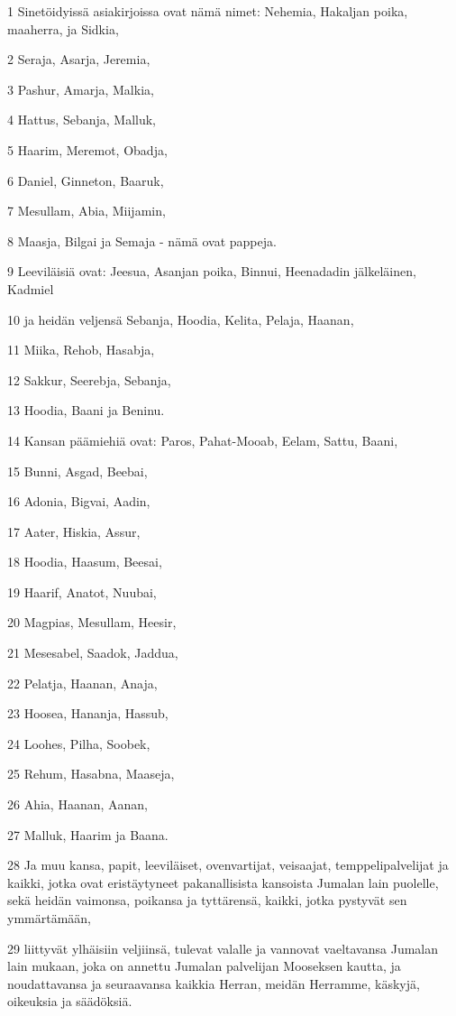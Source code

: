 \par 1 Sinetöidyissä asiakirjoissa ovat nämä nimet: Nehemia, Hakaljan poika, maaherra, ja Sidkia,
\par 2 Seraja, Asarja, Jeremia,
\par 3 Pashur, Amarja, Malkia,
\par 4 Hattus, Sebanja, Malluk,
\par 5 Haarim, Meremot, Obadja,
\par 6 Daniel, Ginneton, Baaruk,
\par 7 Mesullam, Abia, Miijamin,
\par 8 Maasja, Bilgai ja Semaja - nämä ovat pappeja.
\par 9 Leeviläisiä ovat: Jeesua, Asanjan poika, Binnui, Heenadadin jälkeläinen, Kadmiel
\par 10 ja heidän veljensä Sebanja, Hoodia, Kelita, Pelaja, Haanan,
\par 11 Miika, Rehob, Hasabja,
\par 12 Sakkur, Seerebja, Sebanja,
\par 13 Hoodia, Baani ja Beninu.
\par 14 Kansan päämiehiä ovat: Paros, Pahat-Mooab, Eelam, Sattu, Baani,
\par 15 Bunni, Asgad, Beebai,
\par 16 Adonia, Bigvai, Aadin,
\par 17 Aater, Hiskia, Assur,
\par 18 Hoodia, Haasum, Beesai,
\par 19 Haarif, Anatot, Nuubai,
\par 20 Magpias, Mesullam, Heesir,
\par 21 Mesesabel, Saadok, Jaddua,
\par 22 Pelatja, Haanan, Anaja,
\par 23 Hoosea, Hananja, Hassub,
\par 24 Loohes, Pilha, Soobek,
\par 25 Rehum, Hasabna, Maaseja,
\par 26 Ahia, Haanan, Aanan,
\par 27 Malluk, Haarim ja Baana.
\par 28 Ja muu kansa, papit, leeviläiset, ovenvartijat, veisaajat, temppelipalvelijat ja kaikki, jotka ovat eristäytyneet pakanallisista kansoista Jumalan lain puolelle, sekä heidän vaimonsa, poikansa ja tyttärensä, kaikki, jotka pystyvät sen ymmärtämään,
\par 29 liittyvät ylhäisiin veljiinsä, tulevat valalle ja vannovat vaeltavansa Jumalan lain mukaan, joka on annettu Jumalan palvelijan Mooseksen kautta, ja noudattavansa ja seuraavansa kaikkia Herran, meidän Herramme, käskyjä, oikeuksia ja säädöksiä.
